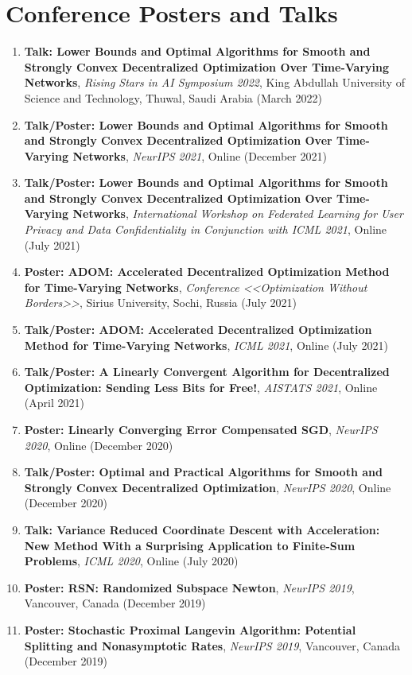 \section{Conference Posters and Talks}
\begin{enumerate}
\item {\bf Talk: Lower Bounds and Optimal Algorithms for Smooth and Strongly Convex Decentralized Optimization Over Time-Varying Networks}, {\em Rising Stars in AI Symposium 2022}, King Abdullah University of Science and Technology, Thuwal, Saudi Arabia (March 2022)
\item {\bf Talk/Poster: Lower Bounds and Optimal Algorithms for Smooth and Strongly Convex Decentralized Optimization Over Time-Varying Networks}, {\em NeurIPS 2021}, Online (December 2021)
\item {\bf Talk/Poster: Lower Bounds and Optimal Algorithms for Smooth and Strongly Convex Decentralized Optimization Over Time-Varying Networks}, {\em International Workshop on Federated Learning for User Privacy and Data Confidentiality in Conjunction with ICML 2021}, Online (July 2021)
\item {\bf Poster: ADOM: Accelerated Decentralized Optimization Method for Time-Varying Networks}, {\em Conference <<Optimization Without Borders>>}, Sirius University, Sochi, Russia (July 2021)
\item {\bf Talk/Poster: ADOM: Accelerated Decentralized Optimization Method for Time-Varying Networks}, {\em ICML 2021}, Online (July 2021)
\item {\bf Talk/Poster: A Linearly Convergent Algorithm for Decentralized Optimization: Sending Less Bits for Free!}, {\em AISTATS 2021}, Online (April 2021)
\item {\bf Poster: Linearly Converging Error Compensated SGD}, {\em NeurIPS 2020}, Online (December 2020)
\item {\bf Talk/Poster: Optimal and Practical Algorithms for Smooth and Strongly Convex Decentralized Optimization}, {\em NeurIPS 2020}, Online (December 2020)
\item {\bf Talk: Variance Reduced Coordinate Descent with Acceleration: New Method With a Surprising Application to Finite-Sum Problems}, {\em ICML 2020}, Online (July 2020)
\item {\bf Poster: RSN: Randomized Subspace Newton}, {\em NeurIPS 2019}, Vancouver, Canada (December 2019)
\item {\bf Poster: Stochastic Proximal Langevin Algorithm: Potential Splitting and Nonasymptotic Rates}, {\em NeurIPS 2019}, Vancouver, Canada (December 2019)

\end{enumerate}

